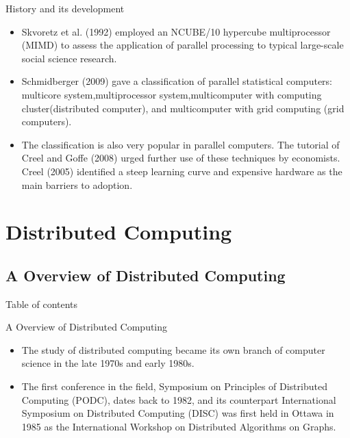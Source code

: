 \documentclass[10pt,aspectratio=169]{beamer}
\begin{document}
\begin{sloppypar}
\begin{frame}{History and its development} \par
	{\color{blue}{Parallel processing for statistics: a review}}
	\begin{itemize}
		\item Skvoretz et al. (1992) employed an NCUBE/10 hypercube
		multiprocessor (MIMD) to assess the application of parallel
		processing to typical large-scale social science research.
		\item Schmidberger (2009) gave a classification of parallel statistical computers:	multicore system,multiprocessor system,multicomputer with computing cluster(distributed computer), and multicomputer with grid computing (grid computers). 
		\item The classification is	also very popular in parallel computers. The tutorial of Creel and Goffe (2008) urged further use of these techniques by economists. Creel (2005) identified a steep learning curve and
		expensive hardware as the main barriers to adoption.					
	\end{itemize}
\end{frame}

\section{Distributed Computing}
\subsection{A Overview of Distributed Computing}
\begin{frame}[shrink]{Table of contents}
	\tableofcontents[sectionstyle=show/shaded,subsectionstyle=show/shaded/hide]
\end{frame}

\begin{frame}{A Overview of Distributed Computing}
	\begin{itemize}
		\item The study of distributed computing became its own branch of computer science in the late 1970s and early 1980s. 
		\item The first conference in the field, Symposium on Principles of Distributed Computing (PODC), dates back to 1982, and its counterpart International Symposium on Distributed Computing (DISC) was first held in
		Ottawa in 1985 as the International Workshop on Distributed Algorithms on Graphs.
	\end{itemize}
\end{frame}


\end{sloppypar}
\end{document}
